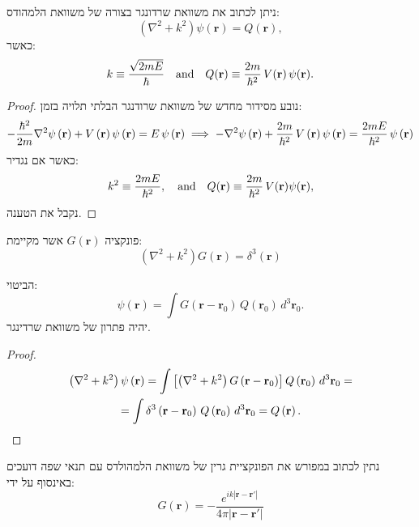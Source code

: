 \documentclass{tstextbook}
\begin{document}
\begin{proposition}
ניתן לכתוב את משוואת שרדונגר בצורה של משוואת הלמהודס:
$$\left(\nabla^{2}+k^{2}\right)\psi(\mathbf{r})=Q(\mathbf{r}),$$
כאשר:
$$k\equiv\frac{\sqrt{2m E}}{\hbar}\quad\mathrm{and}\quad Q({\bf r})\equiv\frac{2m}{\hbar^{2}}\,V({\bf r})\,\psi({\bf r}).$$

\end{proposition}
\begin{proof}
נובע מסידור מחדש של משוואת שרודנגר הבלתי תלויה בזמן:
$$-\frac{\hbar^{2}}{2m}\nabla^{2}\psi\left( \mathbf{r} \right)+V\left( \mathbf{r} \right)\psi\left( \mathbf{r} \right)=E\,\psi\left( \mathbf{r} \right)\implies-\nabla^{2}\psi\left( {\bf r} \right)+\frac{2m}{\hbar^{2}}\,V\left( {\bf r} \right)\psi\left( {\bf r} \right)=\frac{2m E}{\hbar^{2}}\,\psi\left( {\bf r} \right)$$
כאשר אם נגדיר:
$$k^{2}\equiv\frac{2m E}{\hbar^{2}},\quad\mathrm{and}\quad Q({\bf r})\equiv\frac{2m}{\hbar^{2}}\,V({\bf r})\psi({\bf r}),$$
נקבל את הטענה.

\end{proof}
\begin{reminder}
פונקציה \(G\left( \mathbf{r} \right)\) אשר מקיימת:
$$\left(\nabla^{2}+k^{2}\right)G(\mathbf{r})=\delta^{3}(\mathbf{r})$$

\end{reminder}
\begin{proposition}
הביטוי:
$$\psi(\mathbf{r})=\int G(\mathbf{r}-\mathbf{r}_{0})\,Q(\mathbf{r}_{0})\,d^{3}\mathbf{r}_{0}.$$
יהיה פתרון של משוואת שרדינגר.

\end{proposition}
\begin{proof}
\begin{gather*}\left(\nabla^{2}+k^{2}\right)\psi\left(\mathbf{r}\right)=\int\left[\left(\nabla^{2}+k^{2}\right)G\left( \mathbf{r}-\mathbf{r}_{0} \right)\right]Q\left( \mathbf{r}_{0} \right)\,d^{3}\mathbf{r}_{0}=\\=\int\delta^{3}\left( {\bf r}-{\bf r}_{0} \right)\,Q\left( {\bf r}_{0} \right)\,d^{3}{\bf r}_{0}=Q\left( {\bf r} \right). 
\end{gather*}

\end{proof}
\begin{proposition}
נתין לכתוב במפורש את הפונקציית גרין של משוואת הלמהולדס עם תנאי שפה דועכים באינסוף על ידי:
$$G\left( \mathbf{r} \right)=-\frac{e^{i k |\mathbf{r}-\mathbf{r}'|}}{4\pi |\mathbf{r}-\mathbf{r}'|}$$

\end{proposition}
\end{document}
